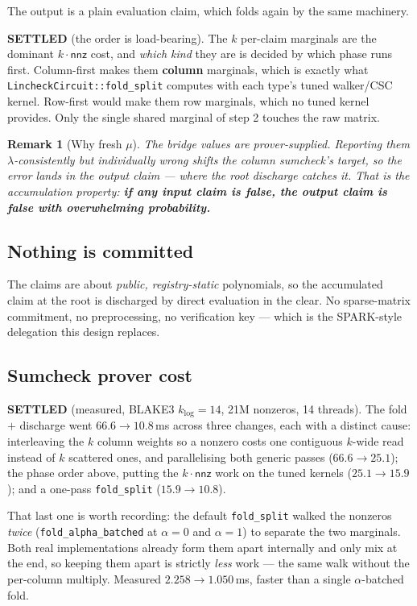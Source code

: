 \documentclass[11pt]{article}
\newcommand{\nnz}{\mathsf{nnz}}
\newcommand{\code}[1]{\texttt{#1}}
\newcommand{\settled}[1]{\medskip\noindent\textbf{SETTLED} (#1).\xspace}
\newtheorem{remark}{Remark}
\theoremstyle{definition}
\begin{document}
The output is a plain evaluation claim, which folds again by the same
machinery.

\settled{the order is load-bearing} The $k$ per-claim marginals are the
dominant $k\cdot\nnz$ cost, and \emph{which kind} they are is decided by
which phase runs first. Column-first makes them \textbf{column} marginals,
which is exactly what \code{LincheckCircuit::fold\_split} computes with each
type's tuned walker/CSC kernel. Row-first would make them row marginals,
which no tuned kernel provides. Only the single shared marginal of step 2
touches the raw matrix.

\begin{remark}[Why fresh $\mu$]
The bridge values are prover-supplied. Reporting them
$\lambda$-consistently but individually wrong shifts the column sumcheck's
target, so the error lands in the output claim --- where the root discharge
catches it. That is the accumulation property: \textbf{if any input claim is
false, the output claim is false with overwhelming probability.}
\end{remark}

\subsection{Nothing is committed}

The claims are about \emph{public, registry-static} polynomials, so the
accumulated claim at the root is discharged by direct evaluation in the
clear. No sparse-matrix commitment, no preprocessing, no verification key
--- which is the SPARK-style delegation this design replaces.

\subsection{Sumcheck prover cost}

\settled{measured, BLAKE3 $k_{\log}=14$, 21M nonzeros, 14 threads} The fold
$+$ discharge went $66.6 \to 10.8$\,ms across three changes, each with a
distinct cause: interleaving the $k$ column weights so a nonzero costs one
contiguous $k$-wide read instead of $k$ scattered ones, and parallelising
both generic passes ($66.6 \to 25.1$); the phase order above, putting the
$k\cdot\nnz$ work on the tuned kernels ($25.1 \to 15.9$); and a one-pass
\code{fold\_split} ($15.9 \to 10.8$).

That last one is worth recording: the default \code{fold\_split} walked the
nonzeros \emph{twice} (\code{fold\_alpha\_batched} at $\alpha = 0$ and
$\alpha = 1$) to separate the two marginals. Both real implementations
already form them apart internally and only mix at the end, so keeping them
apart is strictly \emph{less} work --- the same walk without the per-column
multiply. Measured $2.258 \to 1.050$\,ms, faster than a single
$\alpha$-batched fold.
\end{document}
